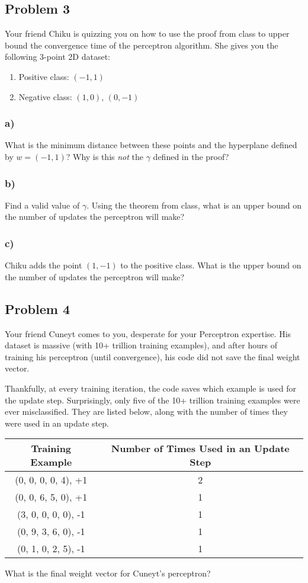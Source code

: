 \documentclass[a4paper]{article}
\begin{document}
\subsection*{Problem 3}
Your friend Chiku is quizzing you on how to use the proof from class to upper bound the convergence time of the perceptron algorithm. She gives you the following 3-point 2D dataset:
\begin{enumerate}
\item Positive class: $(-1, 1)$
\item Negative class: $(1,0)$, $(0,-1)$
\end{enumerate}
\subsubsection*{a)}
What is the minimum distance between these points and the hyperplane defined by $w=(-1,1)$? Why is this \textit{not} the $\gamma$ defined in the proof?
\subsubsection*{b)}
Find a valid value of $\gamma$. Using the theorem from class, what is an upper bound on the number of updates the perceptron will make?
\subsubsection*{c)}
Chiku adds the point $(1,-1)$ to the positive class. What is the upper bound on the number of updates the perceptron will make?

\subsection*{Problem 4}
Your friend Cuneyt comes to you, desperate for your Perceptron expertise. His dataset is massive (with 10+ trillion training examples), and after hours of training his perceptron (until convergence), his code did not save the final weight vector.

Thankfully, at every training iteration, the code saves which example is used for the update step. Surprisingly, only five of the 10+ trillion training examples were ever misclassified. They are listed below, along with the number of times they were used in an update step.

\begin{center}
\begin{tabular}{ c c }
 Training Example & Number of Times Used in an Update Step \\ 
 \hline
 (0, 0, 0, 0, 4),	+1 & 2  \\
 (0, 0, 6, 5, 0),	+1 & 1  \\
 (3, 0, 0, 0, 0),	-1 & 1  \\
 (0, 9, 3, 6, 0),	-1 & 1  \\ 
 (0, 1, 0, 2, 5),	-1 & 1     
\end{tabular}
\end{center}

What is the final weight vector for Cuneyt's perceptron?
\end{document}
